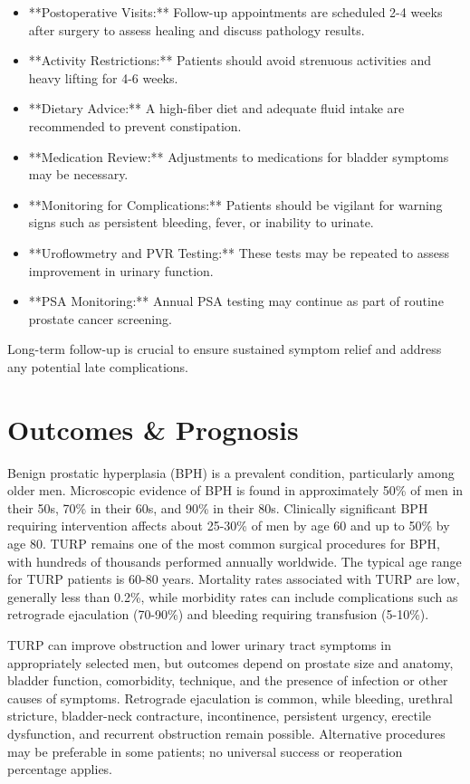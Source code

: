 \begin{itemize}
  \item **Postoperative Visits:** Follow-up appointments are scheduled 2-4 weeks after surgery to assess healing and discuss pathology results.
  \item **Activity Restrictions:** Patients should avoid strenuous activities and heavy lifting for 4-6 weeks.
  \item **Dietary Advice:** A high-fiber diet and adequate fluid intake are recommended to prevent constipation.
  \item **Medication Review:** Adjustments to medications for bladder symptoms may be necessary.
  \item **Monitoring for Complications:** Patients should be vigilant for warning signs such as persistent bleeding, fever, or inability to urinate.
  \item **Uroflowmetry and PVR Testing:** These tests may be repeated to assess improvement in urinary function.
  \item **PSA Monitoring:** Annual PSA testing may continue as part of routine prostate cancer screening.
\end{itemize}

Long-term follow-up is crucial to ensure sustained symptom relief and address any potential late complications.

\section*{Outcomes \& Prognosis}
Benign prostatic hyperplasia (BPH) is a prevalent condition, particularly among older men. Microscopic evidence of BPH is found in approximately 50\% of men in their 50s, 70\% in their 60s, and 90\% in their 80s. Clinically significant BPH requiring intervention affects about 25-30\% of men by age 60 and up to 50\% by age 80. TURP remains one of the most common surgical procedures for BPH, with hundreds of thousands performed annually worldwide. The typical age range for TURP patients is 60-80 years. Mortality rates associated with TURP are low, generally less than 0.2\%, while morbidity rates can include complications such as retrograde ejaculation (70-90\%) and bleeding requiring transfusion (5-10\%).

TURP can improve obstruction and lower urinary tract symptoms in appropriately selected men, but outcomes depend on prostate size and anatomy, bladder function, comorbidity, technique, and the presence of infection or other causes of symptoms. Retrograde ejaculation is common, while bleeding, urethral stricture, bladder-neck contracture, incontinence, persistent urgency, erectile dysfunction, and recurrent obstruction remain possible. Alternative procedures may be preferable in some patients; no universal success or reoperation percentage applies.

